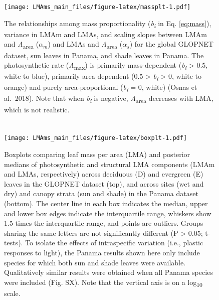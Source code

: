 \documentclass[
  12pt,
]{article}
\providecommand{\DIFaddbeginFL}{} %
\providecommand{\DIFaddendFL}{} %
\providecommand{\DIFdelbeginFL}{} %
\providecommand{\DIFdelendFL}{} %
\newcommand{\DIFscaledelfig}{0.5}
\newlength{\DIFdelgraphicswidth} %
\newlength{\DIFdelgraphicsheight} %
\newcommand{\DIFaddincludegraphics}[2][]{{\color{blue}\fbox{\DIFOincludegraphics[#1]{#2}}}} %
\newcommand{\DIFdelincludegraphics}[2][]{%
\sbox{\DIFdelgraphicsbox}{\DIFOincludegraphics[#1]{#2}}%
\settoboxwidth{\DIFdelgraphicswidth}{\DIFdelgraphicsbox} %
\settoboxtotalheight{\DIFdelgraphicsheight}{\DIFdelgraphicsbox} %
\scalebox{\DIFscaledelfig}{%
\parbox[b]{\DIFdelgraphicswidth}{\usebox{\DIFdelgraphicsbox}\\[-\baselineskip] \rule{\DIFdelgraphicswidth}{0em}}\llap{\resizebox{\DIFdelgraphicswidth}{\DIFdelgraphicsheight}{%
\setlength{\unitlength}{\DIFdelgraphicswidth}%
\begin{picture}(1,1)%
\thicklines\linethickness{2pt} %
{\color[rgb]{1,0,0}\put(0,0){\framebox(1,1){}}}%
{\color[rgb]{1,0,0}\put(0,0){\line( 1,1){1}}}%
{\color[rgb]{1,0,0}\put(0,1){\line(1,-1){1}}}%
\end{picture}%
}\hspace*{3pt}}} %
} %
\DeclareRobustCommand{\DIFaddbeginFL}{\DIFOaddbeginFL \let\includegraphics\DIFaddincludegraphics} %
\DeclareRobustCommand{\DIFaddendFL}{\DIFOaddendFL \let\includegraphics\DIFOincludegraphics} %
\DeclareRobustCommand{\DIFdelbeginFL}{\DIFOdelbeginFL \let\includegraphics\DIFdelincludegraphics} %
\DeclareRobustCommand{\DIFdelendFL}{\DIFOaddendFL \let\includegraphics\DIFOincludegraphics} %
\begin{document}
\begin{figure}
\centering
\DIFdelbeginFL %
\DIFdelendFL \DIFaddbeginFL \texttt{[image: LMAms\_main\_files/figure-latex/massplt-1.pdf]}
\DIFaddendFL \caption{\label{fig:massplt}The relationships among mass proportionality (\emph{b\textsubscript{i}} in Eq. \eqref{eq:mass}), variance in LMAm and LMAs, and scaling slopes between LMAm and \emph{A}\textsubscript{area} (\(\alpha_m\)) and LMAs and \emph{A}\textsubscript{area} (\(\alpha_s\)) for the global GLOPNET dataset, sun leaves in Panama, and shade leaves in Panama. The photosynthetic rate (\emph{A}\textsubscript{max}) is primarily mass-dependent (\emph{b\textsubscript{i}} \textgreater{} 0.5, white to blue), primarily area-dependent (0.5 \textgreater{} \emph{b\textsubscript{i}} \textgreater{} 0, white to orange) and purely area-proportional (\emph{b\textsubscript{i}} = 0, white) (Osnas et al.~2018). Note that when \emph{b\textsubscript{i}} is negative, \emph{A}\textsubscript{area} decreases with LMA, which is not realistic.}
\end{figure}

\newpage

\hypertarget{section-6}{%
\section{}\label{section-6}}

\begin{figure}
\centering
\DIFdelbeginFL %
\DIFdelendFL \DIFaddbeginFL \texttt{[image: LMAms\_main\_files/figure-latex/boxplt-1.pdf]}
\DIFaddendFL \caption{\label{fig:boxplt}Boxplots comparing leaf mass per area (LMA) and posterior medians of photosynthetic and structural LMA components (LMAm and LMAs, respectively) across deciduous (D) and evergreen (E) leaves in the GLOPNET dataset (top), and across sites (wet and dry) and canopy strata (sun and shade) in the Panama dataset (bottom). The center line in each box indicates the median, upper and lower box edges indicate the interquartile range, whiskers show 1.5 times the interquartile range, and points are outliers. Groups sharing the same letters are not significantly different (P \textgreater{} 0.05; t-tests). To isolate the effects of intraspecific variation (i.e., plastic responses to light), the Panama results shown here only include species for which both sun and shade leaves were available. Qualitatively similar results were obtained when all Panama species were included (Fig. SX). Note that the vertical axis is on a log\textsubscript{10} scale.}
\end{figure}
\end{document}
